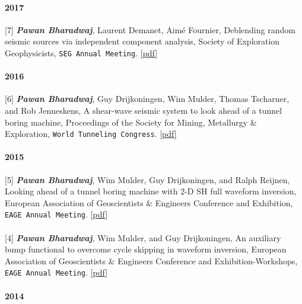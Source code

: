 \documentclass[9pt]{developercv} %
\begin{document}
\paragraph{2017}\label{section-29}

{[}7{]}
\textbf{\emph{Pawan
Bharadwaj}},
Laurent
Demanet,
Aimé
Fournier,
Deblending
random
seismic
sources
via
independent
component
analysis,
Society of
Exploration
Geophysicists,
\texttt{SEG\ Annual\ Meeting}.
\href{https://github.com/pawbz/pawbz.github.io/blob/src/pdf/abstracts/Pawan_ICA_SEG.pdf}{{[}pdf{]}}

\paragraph{2016}\label{section-30}

{[}6{]}
\textbf{\emph{Pawan
Bharadwaj}},
Guy
Drijkoningen,
Wim
Mulder,
Thomas
Tscharner,
and Rob
Jenneskens,
A
shear-wave
seismic
system to
look ahead
of a
tunnel
boring
machine,
Proceedings
of the
Society
for
Mining,
Metallurgy
\&
Exploration,
\texttt{World\ Tunneling\ Congress}.
\href{https://github.com/pawbz/pawbz.github.io/blob/src/pdf/abstracts/WTC2016_Pawan.pdf}{{[}pdf{]}}

\paragraph{2015}\label{section-31}

{[}5{]}
\textbf{\emph{Pawan
Bharadwaj}},
Wim
Mulder,
Guy
Drijkoningen,
and Ralph
Reijnen,
Looking
ahead of a
tunnel
boring
machine
with 2-D
SH full
waveform
inversion,
European
Association
of
Geoscientists
\&
Engineers
Conference
and
Exhibition,
\texttt{EAGE\ Annual\ Meeting}.
\href{https://github.com/pawbz/pawbz.github.io/blob/src/pdf/abstracts/Pawan_looking_aheadEAGE.pdf}{{[}pdf{]}}

\paragraph{}\label{section-32}

{[}4{]}
\textbf{\emph{Pawan
Bharadwaj}},
Wim
Mulder,
and Guy
Drijkoningen,
An
auxiliary
bump
functional
to
overcome
cycle
skipping
in
waveform
inversion,
European
Association
of
Geoscientists
\&
Engineers
Conference
and
Exhibition-Workshops,
\texttt{EAGE\ Annual\ Meeting}.
\href{https://github.com/pawbz/pawbz.github.io/blob/src/pdf/abstracts/bump_functional_workshop.pdf}{{[}pdf{]}}

\paragraph{2014}\label{section-33}
\end{document}
